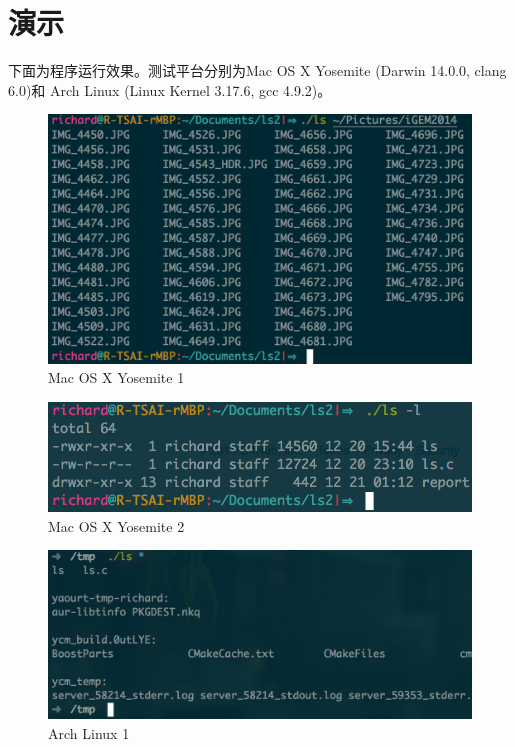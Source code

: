 \documentclass[a4paper, adobefonts]{ctexart}
\begin{document}
\section{演示}
\label{sec:yan_shi_}

下面为程序运行效果。测试平台分别为Mac OS X Yosemite (Darwin 14.0.0, clang 6.0)和
Arch Linux (Linux Kernel 3.17.6, gcc 4.9.2)。

\begin{figure}[htp!]
    \centering
    \includegraphics[scale=0.6]{1.png}
    \caption{Mac OS X Yosemite 1}
    \label{fig:1}
\end{figure}

\begin{figure}[htp!]
    \centering
    \includegraphics[scale=0.6]{2.png}
    \caption{Mac OS X Yosemite 2}
    \label{fig:2}
\end{figure}

\begin{figure}[htp!]
    \centering
    \includegraphics[scale=0.6]{3.png}
    \caption{Arch Linux 1}
    \label{fig:3}
\end{figure}
\end{document}
